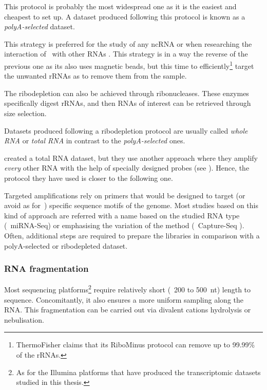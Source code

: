 This protocol is probably the most widespread one as it is the easiest and
cheapest to set up. A dataset produced following this protocol is known as
a \emph{polyA-selected} dataset.\mybr\

This strategy is preferred for the study of any \gls{ncRNA} or when researching
the interaction of \mRNAs\ with other \glspl{RNA} . This
strategy is in a way the reverse of the previous one as its also
uses magnetic beads, but this time to efficiently\footnote{ThermoFisher claims
that its RiboMinus protocol can remove up to 99.99\% of the \glspl{rRNA}.}
target the unwanted \glspl{rRNA} as to remove them from the sample.\mybr\

The ribodepletion can also be achieved through ribonucleases. These enzymes
specifically digest \glspl{rRNA}, and then \glspl{RNA} of interest can be retrieved
through size selection.\mybr\

Datasets produced following a ribodepletion protocol are usually called
\emph{whole \gls{RNA}} or \emph{total \gls{RNA}} in contrast to the
\emph{polyA-selected} ones.\mybr\

\citet{castleData} created a total \gls{RNA} dataset, but they use another
approach where they amplify \emph{every} other \gls{RNA} with the help of
specially designed probes (see ). Hence,
the protocol they have used is closer to the following one.\mybr\

Targeted amplifications rely on primers that would be designed to target (or
avoid as for~\citet{castleData}) specific sequence motifs of the genome.
Most studies based on this kind of approach are referred with
a name based on the studied \gls{RNA} type (\eg\ \gls{miRNA-Seq}) or
emphasising the variation of the method (\eg\ Capture-Seq
).
Often,  additional steps are required to prepare the libraries
in comparison with a polyA-selected or ribodepleted dataset.\mybr\

\subsubsection{RNA fragmentation}

Most sequencing platforms\footnote{As for the Illumina platforms that have
produced the transcriptomic datasets studied in this thesis.} require relatively
short (\ie\ 200 to 500\ nt) length to sequence. Concomitantly, it also ensures
a more uniform sampling along the \gls{RNA}.
This fragmentation can be carried out via divalent cations hydrolysis or
nebulisation.\mybr\

